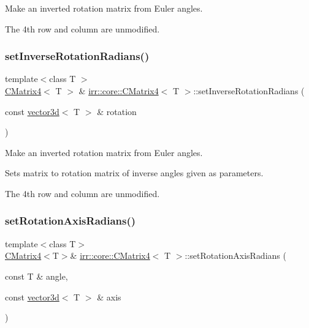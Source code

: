 Make an inverted rotation matrix from Euler angles. 

The 4th row and column are unmodified. \mbox{\label{classirr_1_1core_1_1CMatrix4_a1a15d7b55769678512144f0fb7e15a92}} 
\subsubsection{\texorpdfstring{set\+Inverse\+Rotation\+Radians()}{setInverseRotationRadians()}\hspace{0.1cm}{\footnotesize\ttfamily [2/2]}}
{\footnotesize\ttfamily template$<$class T $>$ \\
\hyperlink{classirr_1_1core_1_1CMatrix4}{C\+Matrix4}$<$ T $>$ \& \hyperlink{classirr_1_1core_1_1CMatrix4}{irr\+::core\+::\+C\+Matrix4}$<$ T $>$\+::set\+Inverse\+Rotation\+Radians (\begin{DoxyParamCaption}\item[{const \hyperlink{classirr_1_1core_1_1vector3d}{vector3d}$<$ T $>$ \&}]{rotation }\end{DoxyParamCaption})\hspace{0.3cm}{\ttfamily [inline]}}



Make an inverted rotation matrix from Euler angles. 

Sets matrix to rotation matrix of inverse angles given as parameters.

The 4th row and column are unmodified. \mbox{\label{classirr_1_1core_1_1CMatrix4_ac00a1c59a2a499ad2f1e97f12d03998a}} 
\subsubsection{\texorpdfstring{set\+Rotation\+Axis\+Radians()}{setRotationAxisRadians()}\hspace{0.1cm}{\footnotesize\ttfamily [1/2]}}
{\footnotesize\ttfamily template$<$class T$>$ \\
\hyperlink{classirr_1_1core_1_1CMatrix4}{C\+Matrix4}$<$T$>$\& \hyperlink{classirr_1_1core_1_1CMatrix4}{irr\+::core\+::\+C\+Matrix4}$<$ T $>$\+::set\+Rotation\+Axis\+Radians (\begin{DoxyParamCaption}\item[{const T \&}]{angle,  }\item[{const \hyperlink{classirr_1_1core_1_1vector3d}{vector3d}$<$ T $>$ \&}]{axis }\end{DoxyParamCaption})\hspace{0.3cm}{\ttfamily [inline]}}



